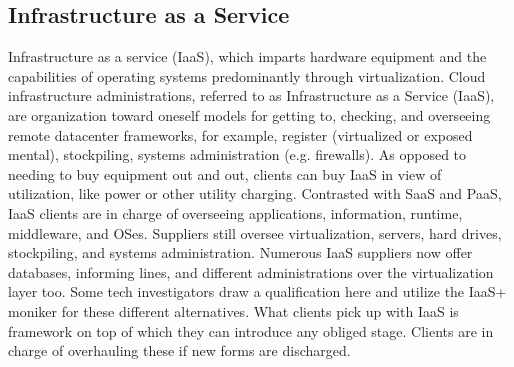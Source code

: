 \subsection{Infrastructure as a Service}
Infrastructure as a service (IaaS), which imparts hardware equipment and the
capabilities of operating systems predominantly through virtualization. Cloud
infrastructure administrations, referred to as Infrastructure as a Service (IaaS), are
organization toward oneself models for getting to, checking, and overseeing remote
datacenter frameworks, for example, register (virtualized or exposed mental),
stockpiling, systems administration (e.g. firewalls). As opposed to needing to buy
equipment out and out, clients can buy IaaS in view of utilization, like power or other
utility charging.
Contrasted with SaaS and PaaS, IaaS clients are in charge of overseeing applications,
information, runtime, middleware, and OSes. Suppliers still oversee virtualization,
servers, hard drives, stockpiling, and systems administration. Numerous IaaS suppliers
now offer databases, informing lines, and different administrations over the
virtualization layer too. Some tech investigators draw a qualification here and utilize the
IaaS+ moniker for these different alternatives. What clients pick up with IaaS is
framework on top of which they can introduce any obliged stage. Clients are in charge
of overhauling these if new forms are discharged.
